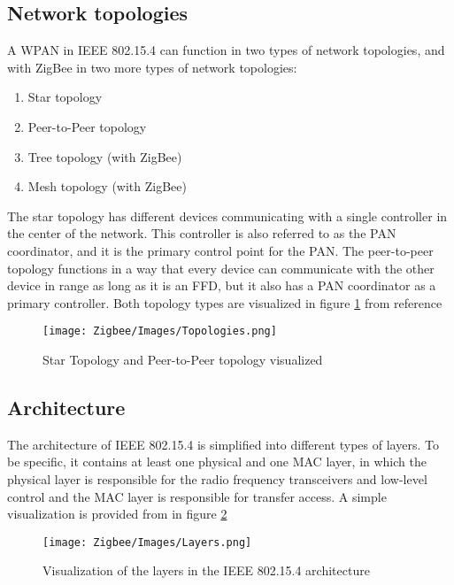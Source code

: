 \documentclass[conference]{IEEEtran}
\begin{document}
\subsection{Network topologies}

A WPAN in IEEE 802.15.4 can function in two types of network topologies, and with ZigBee in two more types of network topologies\cite{2020Standard}:
\begin{enumerate}
    \item Star topology
    \item Peer-to-Peer topology
    \item Tree topology (with ZigBee)
    \item Mesh topology (with ZigBee)
\end{enumerate}

The star topology has different devices communicating with a single controller in the center of the network. This controller is also referred to as the PAN coordinator, and it is the primary control point for the PAN. The peer-to-peer topology functions in a way that every device can communicate with the other device in range as long as it is an FFD, but it also has a PAN coordinator as a primary controller\cite{2020Standard}. Both topology types are visualized in figure \ref{fig:NetworkTopologies} from reference \cite{2020Standard}

\begin{figure}[htbp]
    \centering
    \texttt{[image: Zigbee/Images/Topologies.png]}
    \caption{Star Topology and Peer-to-Peer topology visualized \cite{2020Standard}}
    \label{fig:NetworkTopologies}
\end{figure}

\subsection{Architecture}

The architecture of IEEE 802.15.4 is simplified into different types of layers. To be specific, it contains at least one physical and one MAC layer, in which the physical layer is responsible for the radio frequency transceivers and low-level control and the MAC layer is responsible for transfer access\cite{2020Standard}. A simple visualization is provided from \cite{2020Standard} in figure \ref{fig:Layers}

\begin{figure}[htbp]
    \centering
    \texttt{[image: Zigbee/Images/Layers.png]}
    \caption{Visualization of the layers in the IEEE 802.15.4 architecture\cite{2020Standard}}
    \label{fig:Layers}
\end{figure}
\end{document}
